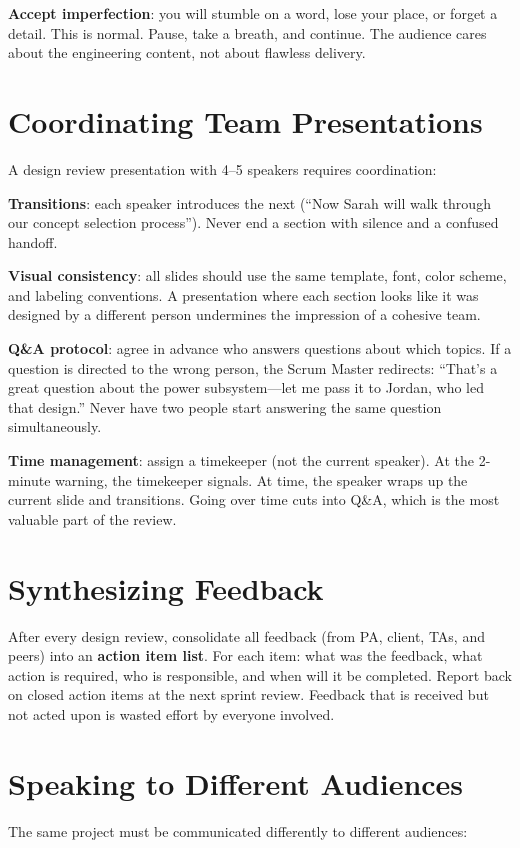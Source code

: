 \textbf{Accept imperfection}: you will stumble on a word, lose your place, or forget a detail. This is normal. Pause, take a breath, and continue. The audience cares about the engineering content, not about flawless delivery.

\section{Coordinating Team Presentations}
A design review presentation with 4--5 speakers requires coordination:

\textbf{Transitions}: each speaker introduces the next (``Now Sarah will walk through our concept selection process''). Never end a section with silence and a confused handoff.

\textbf{Visual consistency}: all slides should use the same template, font, color scheme, and labeling conventions. A presentation where each section looks like it was designed by a different person undermines the impression of a cohesive team.

\textbf{Q\&A protocol}: agree in advance who answers questions about which topics. If a question is directed to the wrong person, the Scrum Master redirects: ``That's a great question about the power subsystem---let me pass it to Jordan, who led that design.'' Never have two people start answering the same question simultaneously.

\textbf{Time management}: assign a timekeeper (not the current speaker). At the 2-minute warning, the timekeeper signals. At time, the speaker wraps up the current slide and transitions. Going over time cuts into Q\&A, which is the most valuable part of the review.

\section{Synthesizing Feedback}
After every design review, consolidate all feedback (from PA, client, TAs, and peers) into an \textbf{action item list}. For each item: what was the feedback, what action is required, who is responsible, and when will it be completed. Report back on closed action items at the next sprint review. Feedback that is received but not acted upon is wasted effort by everyone involved.


\section{Speaking to Different Audiences}
The same project must be communicated differently to different audiences:

